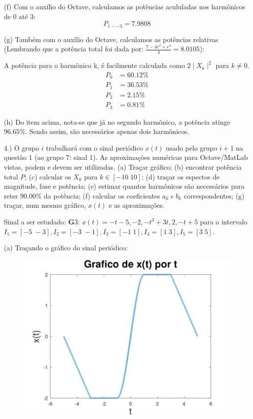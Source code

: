 \documentclass{article}
\begin{document}
\vspace{\baselineskip}

(f) Com o auxílio do Octave, calculamos as potências acululadas nos harmônicos de 0 até 3:
\[P_{1--3} = 7.9808\]

\vspace{\baselineskip}

(g) Também com o auxílio do Octave, calculamos as potências relativas (Lembrando que a potência total foi dada por: $\frac{7 - 4e^{2} + e^4}{4} = 8.0105$):

A potência para o harmônico k, é facilmente calculada como $2\mid X_{k} \mid^{2}$ para $k \neq 0$.
\begin{align*}
    P_{0} &= 60.12\%\\
    P_{1} &= 36.53\%\\
    P_{2} &= 2.15\%\\
    P_{3} &= 0.81\%
\end{align*}

(h) Do item acima, nota-se que já no segundo harmônico, a potência atinge $96.65\%$. Sendo assim, são necessários apenas dois harmônicos.

\vspace{\baselineskip}

4.) O grupo $i$ trabalhará com o sinal periódico $x(t)$ usado pelo grupo $i + 1$ na questão 1 (ao grupo 7: sinal 1). As aproximações numéricas para Octave/MatLab vistas, podem e devem ser utilizadas.
(a) Traçar gráfico;
(b) encontrar potência total $P$;
(c) calcular os $X_{k}$ para $k \in [-10\;10]$;
(d) traçar os espectos de magnitude, fase e potência;
(e) estimar quantos harmônicos são necessários para reter $90.00\%$ da potência;
(f) calcular os coeficientes $a_{k}\;e\;b_{k}$ correspondentes;
(g) traçar, num mesmo gráfico, $x(t)$ e as aproximações.

Sinal a ser estudado: {\textbf G3}: $x(t) = -t - 5, -2, -t^3 + 3t, 2, -t + 5$ para o intervalo $I_{1} = [-5\;-3], I_{2} = [-3\;-1], I_{3} = [-1\;1], I_{4} = [1\;3], I_{5} = [3\;5]$.

\newpage

(a) Traçando o gráfico do sinal periódico:

\begin{figure}[!ht]
    \includegraphics[scale=0.3]{plot4a}
    \centering
\end{figure}
\end{document}
